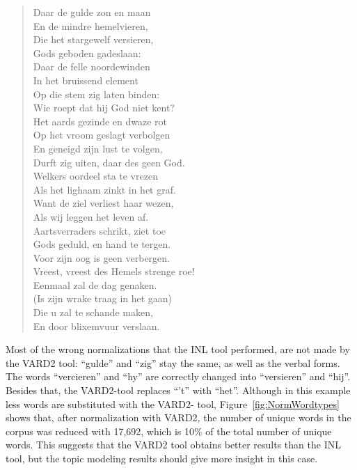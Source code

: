 \begin{quote}
	Daar de gulde zon en maan\\
	En de mindre hemelvieren,\\
	Die het stargewelf versieren,\\
	Gods geboden gadeslaan:\\
	Daar de felle noordewinden\\
	In het bruissend element\\
	Op die stem zig laten binden:\\
	Wie roept dat hij God niet kent?\\
	
	Het aards gezinde en dwaze rot\\
	Op het vroom geslagt verbolgen\\
	En geneigd zijn lust te volgen,\\
	Durft zig uiten, daar des geen God.\\
	Welkers oordeel sta te vrezen\\
	Als het lighaam zinkt in het graf.\\
	Want de ziel verliest haar wezen,\\
	Als wij leggen het leven af.\\
	
	Aartsverraders schrikt, ziet toe\\
	Gods geduld, en hand te tergen.\\
	Voor zijn oog is geen verbergen.\\
	Vreest, vreest des Hemels strenge roe!\\
	Eenmaal zal de dag genaken.\\
	(Is zijn wrake traag in het gaan)\\
	Die u zal te schande maken,\\
	En door blixemvuur verslaan.\\
\end{quote}

\noindent Most of the wrong normalizations that the INL tool performed, are not made by the VARD2 tool: \enquote{gulde} and \enquote{zig} stay the same, as well as the verbal forms. The words \enquote{vercieren} and \enquote{hy} are correctly changed into \enquote{versieren} and \enquote{hij}. Besides that, the VARD2-tool replaces \enquote{'t} with \enquote{het}. Although in this example less words are substituted with the VARD2- tool, Figure~\ref{fig:NormWordtypes} shows that, after normalization with VARD2, the number of unique words in the corpus was reduced with 17,692, which is 10\% of the total number of unique words. This suggests that the VARD2 tool obtains better results than the INL tool, but the topic modeling results should give more insight in this case.